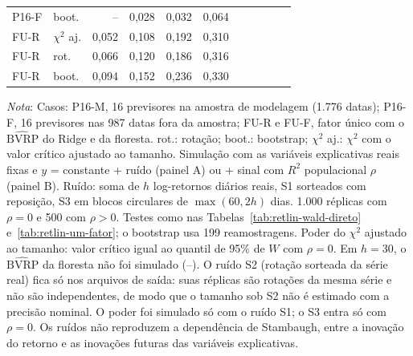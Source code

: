 \begin{table}[H]
{\begin{tabular}{llrrrrrrrrr}
P16-F & boot. & -- & 0{,}028 & 0{,}032 & 0{,}064 & & & & & \\
FU-R & $\chi^2$ aj. & 0{,}052 & 0{,}108 & 0{,}192 & 0{,}310 & & & & & \\
FU-R & rot. & 0{,}066 & 0{,}120 & 0{,}186 & 0{,}316 & & & & & \\
FU-R & boot. & 0{,}094 & 0{,}152 & 0{,}236 & 0{,}330 & & & & & \\
\bottomrule
\end{tabular}}
\par\smallskip
\parbox{0.95\linewidth}{\footnotesize\textit{Nota}: Casos: P16-M, 16 previsores na amostra de modelagem (1.776 datas); P16-F, 16 previsores nas 987 datas fora da amostra; FU-R e FU-F, fator único com o $\widehat{\text{BVRP}}$ do Ridge e da floresta. rot.: rotação; boot.: bootstrap; $\chi^2$ aj.: $\chi^2$ com o valor crítico ajustado ao tamanho. Simulação com as variáveis explicativas reais fixas e $y$ = constante + ruído (painel A) ou + sinal com $R^2$ populacional $\rho$ (painel B). Ruído: soma de $h$ log-retornos diários reais, S1 sorteados com reposição, S3 em blocos circulares de $\max(60, 2h)$ dias. 1.000 réplicas com $\rho = 0$ e 500 com $\rho > 0$. Testes como nas Tabelas~\ref{tab:retlin-wald-direto} e~\ref{tab:retlin-um-fator}; o bootstrap usa 199 reamostragens. Poder do $\chi^2$ ajustado ao tamanho: valor crítico igual ao quantil de 95\% de $W$ com $\rho = 0$. Em $h = 30$, o $\widehat{\text{BVRP}}$ da floresta não foi simulado (--). O ruído S2 (rotação sorteada da série real) fica só nos arquivos de saída: suas réplicas são rotações da mesma série e não são independentes, de modo que o tamanho sob S2 não é estimado com a precisão nominal. O poder foi simulado só com o ruído S1; o S3 entra só com $\rho = 0$. Os ruídos não reproduzem a dependência de Stambaugh, entre a inovação do retorno e as inovações futuras das variáveis explicativas.}
\end{table}
